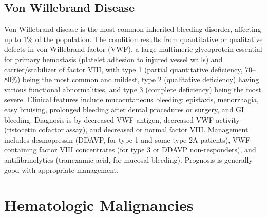 \subsection{Von Willebrand Disease}
\label{sec:Von Willebrand Disease}
Von Willebrand disease is the most common inherited bleeding disorder, affecting up to 1\% of the population. The condition results from quantitative or qualitative defects in von Willebrand factor (VWF), a large multimeric glycoprotein essential for primary hemostasis (platelet adhesion to injured vessel walls) and carrier/stabilizer of factor VIII, with type 1 (partial quantitative deficiency, 70--80\%) being the most common and mildest, type 2 (qualitative deficiency) having various functional abnormalities, and type 3 (complete deficiency) being the most severe. Clinical features include mucocutaneous bleeding: epistaxis, menorrhagia, easy bruising, prolonged bleeding after dental procedures or surgery, and GI bleeding. Diagnosis is by decreased VWF antigen, decreased VWF activity (ristocetin cofactor assay), and decreased or normal factor VIII. Management includes desmopressin (DDAVP, for type 1 and some type 2A patients), VWF-containing factor VIII concentrates (for type 3 or DDAVP non-responders), and antifibrinolytics (tranexamic acid, for mucosal bleeding). Prognosis is generally good with appropriate management.

\section{Hematologic Malignancies}








\label{sec:Hematologic Malignancies}

